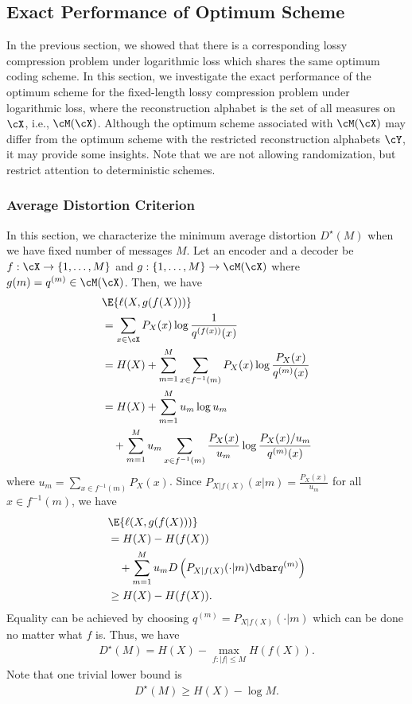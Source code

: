 \documentclass[draftclsnofoot, onecolumn, letterpaper, romanappendices]{IEEEtran}
\begin{document}
\subsection{Exact Performance of Optimum Scheme}
In the previous section, we showed that there is a corresponding lossy compression problem
under logarithmic loss which shares the same optimum coding scheme.
In this section, we investigate the exact performance of the optimum scheme
for the fixed-length lossy compression problem under logarithmic loss,
where the reconstruction alphabet is the set of all measures on $\cX$, i.e., $\cM(\cX)$.
Although the optimum scheme associated with $\cM(\cX)$ may differ from
the optimum scheme with the restricted reconstruction alphabets $\cY$,
it may provide some insights.
Note that we are not allowing randomization, but restrict attention to deterministic schemes.


\subsubsection{Average Distortion Criterion}
In this section, we characterize the minimum average distortion $D^{\star}(M)$
when we have fixed number of messages $M$.
Let an encoder and a decoder be $f:\cX\rightarrow\{1,\ldots,M\}$
and $g:\{1,\ldots,M\}\rightarrow \cM(\cX)$ where $g(m) = q^{(m)}\in\cM(\cX)$.
Then, we have
\begin{align*}
    &\E{\ell(X,g(f(X)))}\nonumber\\
    &= \sum_{x\in\cX} P_X(x) \log \frac{1}{q^{(f(x))}(x)}\\
    &= H(X)+\sum_{m=1}^M \sum_{x\in f^{-1}(m)} P_X(x) \log \frac{P_X(x)}{q^{(m)}(x)}\\
    &= H(X)+\sum_{m=1}^M u_m \log u_m\nonumber\\
    &~~~+\sum_{m=1}^M  u_m\sum_{x\in f^{-1}(m)} \frac{P_X(x)}{u_m} \log \frac{P_X(x)/u_m}{q^{(m)}(x)}
\end{align*}
where $u_m = \sum_{x\in f^{-1}(m)} P_X(x)$.
Since $P_{X|f(X)}(x|m) = \frac{P_X(x)}{u_m}$ for all $x\in f^{-1}(m)$, we have
\begin{align*}
    &\E{\ell(X,g(f(X)))}\nonumber\\
    &= H(X)-H(f(X))\nonumber\\
    &~~~+\sum_{m=1}^M  u_m D\left(P_{X|f(X)}(\cdot|m)\dbar q^{(m)}\right)\\
    &\geq H(X)-H(f(X)).
\end{align*}
Equality can be achieved by choosing $q^{(m)} = P_{X|f(X)}(\cdot|m)$
which can be done no matter what $f$ is.
Thus, we have
\begin{align*}
    D^{\star}(M) = H(X) - \max_{f: |f|\leq M} H(f(X)).
\end{align*}
Note that one trivial lower bound is
\begin{align*}
    D^{\star}(M) \geq H(X) - \log M.
\end{align*}
\end{document}
